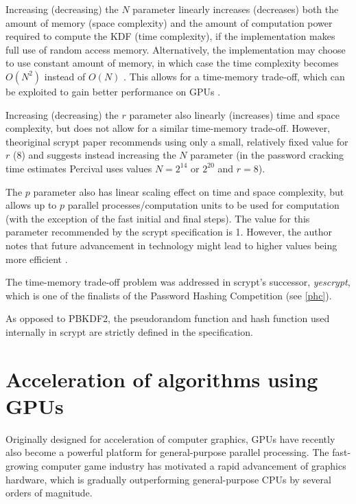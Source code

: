\documentclass[12pt,oneside]{fithesis2}
\begin{document}
      Increasing (decreasing) the $N$ parameter linearly increases (decreases) both the amount of memory (space complexity) and the amount of computation power required to compute the KDF (time complexity), if the implementation makes full use of random access memory. Alternatively, the implementation may choose to use constant amount of memory, in which case the time complexity becomes $O(N^2)$ instead of $O(N)$ \cite[chapter 5, proof of theorem 1]{scrypt}. This allows for a time-memory trade-off, which can be exploited to gain better performance on GPUs \cite{scrypt:tradeoff, openwall:pwHashing}.
      
      Increasing (decreasing) the $r$ parameter also linearly (increases) time and space complexity, but does not allow for a similar time-memory trade-off. However, theoriginal scrypt paper recommends using only a small, relatively fixed value for $r$ (8) and suggests instead increasing the $N$ parameter (in the password cracking time estimates \cite[chapter 8]{scrypt} Percival uses values $N = 2^{14}$ or $2^{20}$ and $r = 8$).
      
      The $p$ parameter also has linear scaling effect on time and space complexity, but allows up to $p$ parallel processes/computation units to be used for computation (with the exception of the fast initial and final steps). The value for this parameter recommended by the scrypt specification is 1. However, the author notes that future advancement in technology might lead to higher values being more efficient \cite[chapter 7]{scrypt}.
      
      The time-memory trade-off problem was addressed in scrypt's successor, \emph{yescrypt}, which is one of the finalists of the Password Hashing Competition (see \ref{phc}).
      
      As opposed to PBKDF2, the pseudorandom function and hash function used internally in scrypt are strictly defined in the specification.
      
    \chapter{Acceleration of algorithms using GPUs}
      Originally designed for acceleration of computer graphics, GPUs have recently also become a powerful platform for general-purpose parallel processing. The fast-growing computer game industry has motivated a rapid advancement of graphics hardware, which is gradually outperforming general-purpose CPUs by several orders of magnitude.
      
\end{document}
